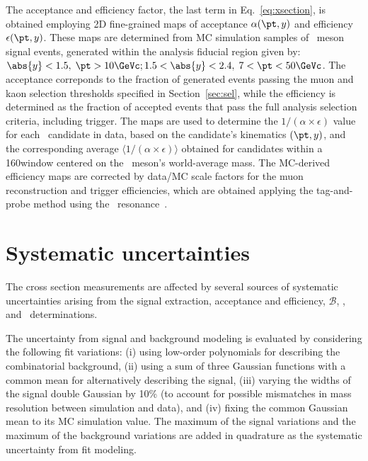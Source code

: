 \documentclass[11pt,twoside,a4paper,cmspaper]{cms-tdr}
\begin{document}
The acceptance and efficiency factor, the last term in Eq.~\ref{eq:xsection}, is obtained employing 2D fine-grained maps of acceptance $\alpha (\pt,y)$ and efficiency $\epsilon(\pt,y)$.
These maps are determined from MC simulation samples of \PB\ meson signal events, generated within the analysis fiducial region given by: $\abs{y}<1.5, \; \pt>10\GeVc; 1.5<\abs{y}<2.4, \; 7<\pt<50\GeVc$.
%
The acceptance correponds to the fraction of generated events passing the muon and kaon selection thresholds specified in Section~\ref{sec:sel}, while the efficiency is determined as the fraction of accepted events that pass the full analysis selection criteria, including trigger.
%
The maps are used to determine the $1/(\alpha\times\epsilon)$ value for each \PB\ candidate in data, based on the candidate's kinematics $(\pt,y)$, and the corresponding average $\langle 1/(\alpha\times \epsilon)\rangle$ obtained for candidates within a 160\GeVcc window centered on the \PB\ meson's world-average mass. 
The MC-derived efficiency maps are corrected by data/MC scale factors for the muon reconstruction and trigger efficiencies, which are obtained applying the tag-and-probe method using the \PJGy\ resonance~\cite{Khachatryan:2010zg}.
%


\section{Systematic uncertainties}

The cross section measurements are affected by several sources of systematic uncertainties arising from the signal extraction, acceptance and efficiency, $\mathcal{B}$, \NMB, and \TAA\ determinations.

The uncertainty from signal and background modeling is evaluated by considering the following fit variations:
(i) using low-order polynomials for describing the combinatorial background, 
(ii) using a sum of three Gaussian functions with a common mean for alternatively describing the signal,
(iii) varying the widths of the signal double Gaussian by 10\% (to account for possible mismatches in mass resolution between simulation and data), and
(iv) fixing the common Gaussian mean to its MC simulation value. 
The maximum of the signal variations and the maximum of the background variations are added in quadrature as the systematic uncertainty from fit modeling.
\end{document}
